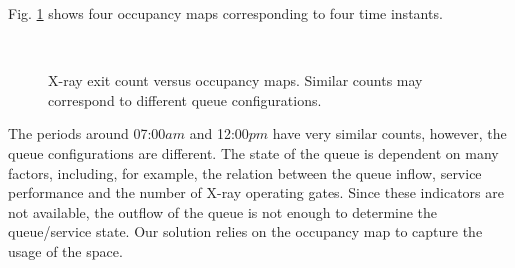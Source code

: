 Fig. \ref{fig:countings-maps} shows four occupancy maps corresponding to four time instants. 
\begin{figure}[bth]
\centering
{}\\
\caption{X-ray exit count versus occupancy maps. Similar counts may correspond to different queue configurations.}
\label{fig:countings-maps}
\end{figure}
%
The periods around 07:00$am$ and 12:00$pm$ have very similar counts, however, the queue configurations are different. 
The state of the queue is dependent on many factors, including, for example, the relation between the queue inflow, service performance and the number of X-ray operating gates. 
Since these indicators are not available, the outflow of the queue is not enough to determine the queue/service state. Our solution relies on the occupancy map to capture the usage of the space.
%


